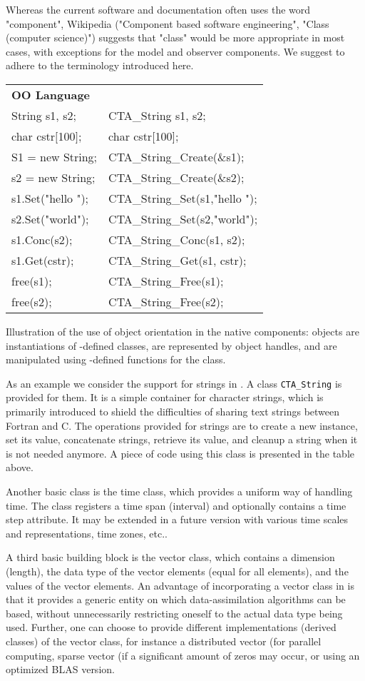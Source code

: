 Whereas the current \oda software and documentation often uses the word "component", Wikipedia ("Component based software engineering", "Class (computer science)") suggests that "class" would be more appropriate in most cases, with exceptions for the model and observer components. We suggest to adhere to the terminology introduced here.

\begin{tabular}{l l}
\textbf{OO Language} &	\textbf{\oda}\\
String s1, s2; &	CTA\_String s1, s2;\\
char cstr$[$100$]$; &	char cstr[100];\\
S1 = new String; &	CTA\_String\_Create(\&s1);\\
s2 = new String; &	CTA\_String\_Create(\&s2);\\
s1.Set("hello "); &	CTA\_String\_Set(s1,"hello ");\\
s2.Set("world"); &	CTA\_String\_Set(s2,"world");\\
s1.Conc(s2); &	CTA\_String\_Conc(s1, s2);\\
s1.Get(cstr); &	CTA\_String\_Get(s1, cstr);\\
free(s1); &	CTA\_String\_Free(s1);\\
free(s2); &	CTA\_String\_Free(s2);\\
\end{tabular}

Illustration of the use of object orientation in the \oda native components: objects are instantiations of \oda-defined classes, are represented by object handles, and are manipulated using \oda-defined functions for the class.

As an example we consider the support for strings in \oda. A class \verb|CTA_String| is provided for them. It is a simple container for character strings, which is primarily introduced to shield the difficulties of sharing text strings between Fortran and C. The operations provided for \oda strings are to create a new instance, set its value, concatenate strings, retrieve its value, and cleanup a string when it is not needed anymore. A piece of code using this class is presented in the table above.

Another basic class is the \oda time class, which provides a uniform way of handling time. The class registers a time span (interval) and optionally contains a time step attribute. It may be extended in a future version with various time scales and representations, time zones, etc..

A third basic building block is the \oda vector class, which contains a dimension (length), the data type of the vector elements (equal for all elements), and the values of the vector elements. An advantage of incorporating a vector class in \oda is that it provides a generic entity on which data-assimilation algorithms can be based, without unnecessarily restricting oneself to the actual data type being used. Further, one can choose to provide different implementations (derived classes) of the vector class, for instance a distributed vector (for parallel computing, sparse vector (if a significant amount of zeros may occur, or using an optimized BLAS version.

